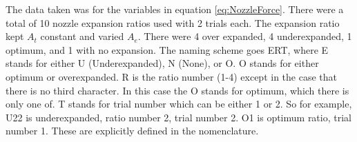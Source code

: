 The data taken was for the variables in equation \ref{eq:NozzleForce}. There were a total of 10 nozzle expansion ratios used with 2 trials each. The expansion ratio kept $A_t$ constant and varied $A_e$. There were 4 over expanded, 4 underexpanded, 1 optimum, and 1 with no expansion. The naming scheme goes ERT, where E stands for either U (Underexpanded), N (None), or O. O stands for either optimum or overexpanded. R is the ratio number (1-4) except in the case that there is no third character. In this case the O stands for optimum, which there is only one of. T stands for trial number which can be either 1 or 2. So for example, U22 is underexpanded, ratio number 2, trial number 2. O1 is optimum ratio, trial number 1. These are explicitly defined in the nomenclature.%
%
%
%
%
%
%
%
%
%
%
%
%
%
%
%
%
%
%
